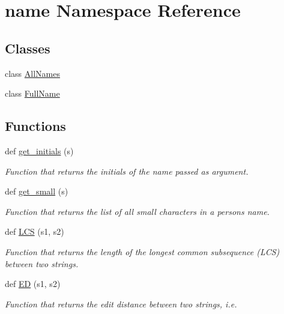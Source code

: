 \hypertarget{namespacename}{}\section{name Namespace Reference}
\label{namespacename}
\subsection*{Classes}
\begin{DoxyCompactItemize}
\item 
class \hyperlink{classname_1_1AllNames}{All\+Names}
\item 
class \hyperlink{classname_1_1FullName}{Full\+Name}
\end{DoxyCompactItemize}
\subsection*{Functions}
\begin{DoxyCompactItemize}
\item 
def \hyperlink{namespacename_aac6586237940f09049413cfc51952677}{get\+\_\+initials} (s)
\begin{DoxyCompactList}\small\item\em Function that returns the initials of the name passed as argument. \end{DoxyCompactList}\item 
def \hyperlink{namespacename_aea030be0c4aba39c00144f53b219b5fb}{get\+\_\+small} (s)
\begin{DoxyCompactList}\small\item\em Function that returns the list of all small characters in a person\textquotesingle{}s name. \end{DoxyCompactList}\item 
def \hyperlink{namespacename_a662ec0d5b529dcd09fe92f4011739422}{L\+CS} (s1, s2)
\begin{DoxyCompactList}\small\item\em Function that returns the length of the longest common subsequence (L\+CS) between two strings. \end{DoxyCompactList}\item 
def \hyperlink{namespacename_aaf6a02e97478e39abbec27e09d4d3fc7}{ED} (s1, s2)
\begin{DoxyCompactList}\small\item\em Function that returns the edit distance between two strings, i.\+e. \end{DoxyCompactList}\end{DoxyCompactItemize}
